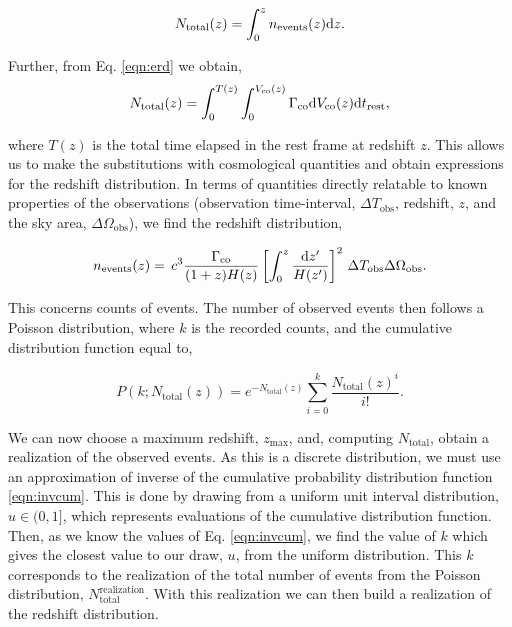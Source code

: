 \begin{equation}\label{eqn:total_dist}
N_{\mathrm{total}}(z) = \int_0^{z} n_{\mathrm{events}}(z) \mathrm{d} z.
\end{equation}\par
Further, from Eq. \ref{eqn:erd} we obtain,
\begin{equation}
N_{\mathrm{ total}}(z) = \int_0^{T (z)} \int_0^{V_{\mathrm{co}}(z)}  \Gamma_{\mathrm{co}} \mathrm{d} V_{\mathrm{co}}(z)\mathrm{d} t_{\mathrm{rest}},
\end{equation}\par

where $T(z)$ is the total time elapsed in the rest frame at redshift $z$. This allows us to make the substitutions with cosmological quantities and obtain expressions for the redshift distribution. In terms of quantities directly relatable to known properties of the observations (observation time-interval, $\Delta T_{\mathrm{obs}}$, redshift, $z$, and the sky area, $\Delta \Omega_{\mathrm{obs}}$), we find the redshift distribution,\par

\begin{align}\label{eqn:reddist}
n_{\mathrm{events}}(z) = \, c^3  \frac{\Gamma_{\mathrm{co}}}{(1+z)H(z)} \left[\int^{z}_0 \frac{\mathrm{d} z'}{H(z')} \right]^2 \, \Delta T_{\mathrm{obs}} \Delta \Omega_{\mathrm{obs}}.
\end{align}\par

This concerns counts of events. The number of observed events then follows a Poisson distribution, where $k$ is the recorded counts, and the cumulative distribution function equal to,

\begin{equation}\label{eqn:invcum}
P(k;N_{\mathrm{total}}(z)) =e^{-N_{\mathrm{ total}}(z)} \sum_{i=0}^k \frac{N_{\mathrm{ total}}(z)^i}{i!}.
\end{equation}\par

We can now choose a maximum redshift, $z_{\mathrm{max}}$, and, computing $N_{\mathrm{ total}}$, obtain a realization of the observed events. As this is a discrete distribution, we must use an approximation of inverse of the cumulative probability distribution function \ref{eqn:invcum}. This is done by drawing from a uniform unit interval distribution, $u\in(0,1]$, which represents evaluations of the cumulative distribution function. Then, as we know the values of Eq. \ref{eqn:invcum}, we find the value of $k$ which gives the closest value to our draw, $u$, from the uniform distribution. This $k$ corresponds to the realization of the total number of events from the Poisson distribution, $N_{\mathrm{ total}}^{\mathrm{realization}}$. With this realization we can then build a realization of the redshift distribution.\par

